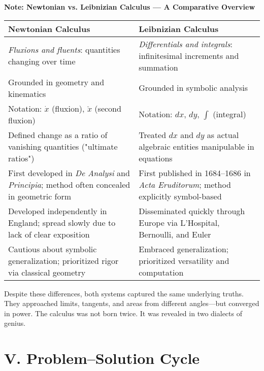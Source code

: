 \documentclass[9pt]{article}
\begin{document}
\vspace{1em}
\noindent
\textbf{Note: Newtonian vs. Leibnizian Calculus — A Comparative Overview}

\begin{center}
\begin{tabular}{|p{6.5cm}|p{6.5cm}|}
\hline
\textbf{Newtonian Calculus} & \textbf{Leibnizian Calculus} \\
\hline
\textit{Fluxions and fluents}: quantities changing over time & \textit{Differentials and integrals}: infinitesimal increments and summation \\
\hline
Grounded in geometry and kinematics & Grounded in symbolic analysis \\
\hline
Notation: $\dot{x}$ (fluxion), $\ddot{x}$ (second fluxion) & Notation: $dx$, $dy$, $\int$ (integral) \\
\hline
Defined change as a ratio of vanishing quantities ("ultimate ratios") & Treated $dx$ and $dy$ as actual algebraic entities manipulable in equations \\
\hline
First developed in \textit{De Analysi} and \textit{Principia}; method often concealed in geometric form & First published in 1684–1686 in \textit{Acta Eruditorum}; method explicitly symbol-based \\
\hline
Developed independently in England; spread slowly due to lack of clear exposition & Disseminated quickly through Europe via L’Hospital, Bernoulli, and Euler \\
\hline
Cautious about symbolic generalization; prioritized rigor via classical geometry & Embraced generalization; prioritized versatility and computation \\
\hline
\end{tabular}
\end{center}

\vspace{0.5em}
\noindent
Despite these differences, both systems captured the same underlying truths. They approached limits, tangents, and areas from different angles—but converged in power. The calculus was not born twice. It was revealed in two dialects of genius.


\newpage

\section*{V. Problem--Solution Cycle}
\end{document}
